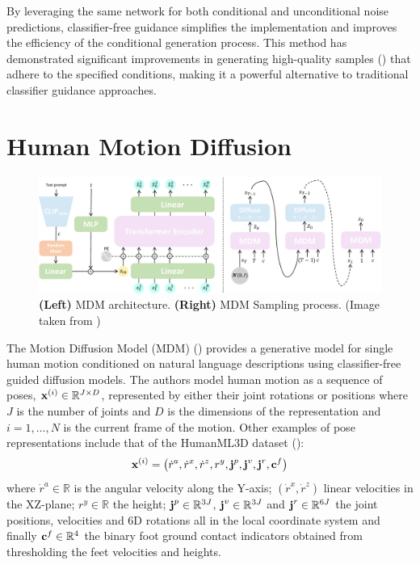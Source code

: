 By leveraging the same network for both conditional and unconditional noise predictions, classifier-free guidance simplifies the implementation and improves the efficiency of the conditional generation process. This method has demonstrated significant improvements in generating high-quality samples (\cite{ho2021classifierfree}) that adhere to the specified conditions, making it a powerful alternative to traditional classifier guidance approaches.




\section{Human Motion Diffusion}
\begin{figure}[H]
    \centering
    \includegraphics[width=\linewidth]{figures/mdm_comb.pdf}
    \caption{\textbf{(Left)} MDM architecture. \textbf{(Right)} MDM Sampling process. (Image taken from \cite{tevet2023human})}
    \label{fig:mdm}
\end{figure}
The Motion Diffusion Model (MDM) (\cite{tevet2023human}) provides a generative model for single human motion conditioned on natural language descriptions using classifier-free guided diffusion models. The authors model human motion as a sequence of poses, $\boldsymbol{\mathbf{x}}^{(i)} \in \mathbb{R}^{J \times D}$, represented by either their joint rotations or positions where $J$ is the number of joints and $D$ is the dimensions of the representation and $i = 1, \ldots, N$ is the current frame of the motion. Other examples of pose representations include that of the HumanML3D dataset (\cite{Guo_2022_CVPR}):
\begin{equation}
    \boldsymbol{\mathbf{x}}^{(i)} = \left(\dot{r}^a, \dot{r}^x, \dot{r}^z, r^y, \boldsymbol{\mathbf{j}}^p, \boldsymbol{\mathbf{j}}^v, \boldsymbol{\mathbf{j}}^r, \boldsymbol{\mathbf{c}}^f\right)
    \label{eq:hml3d-repr}
\end{equation}
where $\dot{r}^a \in \mathbb{R}$ is the angular velocity along the Y-axis; $(\dot{r}^x, \dot{r}^z)$ linear velocities in the XZ-plane; $r^y \in \mathbb{R}$ the height; $\boldsymbol{\mathbf{j}}^p \in \mathbb{R}^{3J}$, $\boldsymbol{\mathbf{j}}^v \in \mathbb{R}^{3J}$ and $\boldsymbol{\mathbf{j}}^r \in \mathbb{R}^{6J}$ the joint positions, velocities and 6D rotations all in the local coordinate system and finally $\boldsymbol{\mathbf{c}}^f \in \mathbb{R}^{4}$ the binary foot ground contact indicators obtained from thresholding the feet velocities and heights.

